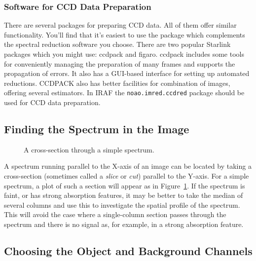 \documentclass[twoside,11pt]{article}
\newcommand{\htmlref}[2]{#1}
\newcommand{\xref}[3]{#1}
\newcommand{\xlabel}[1]{}
\newcommand{\mlabel}[1]{\xlabel{#1}\label{#1}}
\newcommand{\scspec}[2]{#1}
\newcommand{\scspec}[2]{#2}
\begin{document}
\subsubsection{Software for CCD Data Preparation}

There are several packages for preparing \htmlref{CCD}{gl_ccd} data.
All of them offer similar functionality.
You'll find that it's easiest to use the package which complements
the spectral reduction software you choose.
There are two popular Starlink packages which you might use:
\xref{{\sc ccdpack}}{sun139}{} and \xref{{\sc figaro}}{sun86}{}\@.
{\sc ccdpack} includes some tools for conveniently managing the preparation
of many frames and supports the propagation of errors.
It also has a GUI-based interface for setting up automated reductions.
CCDPACK also has better facilities for combination of images, offering
several estimators.
In IRAF the {\tt noao.imred.ccdred} package should be used for CCD
data preparation.


\subsection{\mlabel{finding_spectrum}Finding the Spectrum in the Image}

\begin{figure}
\begin{center}
  \scspec{\leavevmode\epsfysize=105mm\epsfbox{sc7_02.eps}}
          {\leavevmode\epsfysize=136mm}

  \parbox{140mm}{
    \caption{A cross-section through a simple spectrum.}
    \label{fi_spectrum_locate}
  }
\end{center}
\end{figure}

A spectrum running parallel to the X-axis of an image can
be located by taking a cross-section (sometimes called a {\em slice} or {\em
cut}) parallel to the Y-axis.  For a simple spectrum, a plot of such a
section will appear as in \scspec{Figure~\ref{fi_spectrum_locate}}{the figure
above}.
If the spectrum is
faint, or has strong absorption features, it may be better to take the
median of several columns and use this to investigate the spatial profile
of the spectrum.  This will avoid the case where a single-column section
passes through the spectrum and there is no signal as, for example, in a
strong absorption feature.


\subsection{\mlabel{selecting_channels}Choosing the Object and Background
            Channels}
\end{document}
